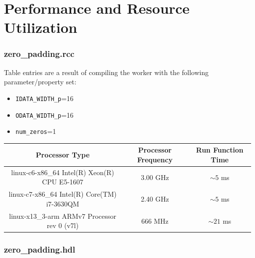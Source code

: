 \documentclass{article}
\def\comp{zero\_padding}
\edef\ecomp{zero_padding}
\begin{document}
\section*{Performance and Resource Utilization}
\subsubsection*{\comp.rcc}
Table entries are a result of compiling the worker with the following parameter/property set:\
\begin{itemize}
	\item \verb+IDATA_WIDTH_p+=16
	\item \verb+ODATA_WIDTH_p+=16
	\item \verb+num_zeros+=1
\end{itemize}
\begin{scriptsize}
	\begin{tabular}{|c|c|c|}
		\hline
		\rowcolor{blue}
		Processor Type                                & Processor Frequency & Run Function Time \\
		\hline
		linux-c6-x86\_64 Intel(R) Xeon(R) CPU E5-1607 & 3.00 GHz            & $\sim5$ ms        \\
		\hline
		linux-c7-x86\_64 Intel(R) Core(TM) i7-3630QM  & 2.40 GHz            & $\sim5$ ms        \\
		\hline
		linux-x13\_3-arm ARMv7 Processor rev 0 (v7l)    & 666 MHz             & $\sim21$ ms       \\
		\hline
	\end{tabular}
\end{scriptsize}
\subsubsection*{\comp.hdl}

\end{document}
